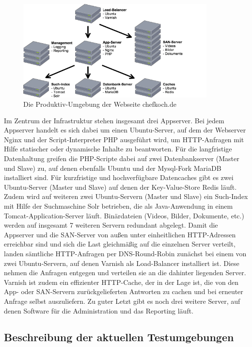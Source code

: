 \begin{figure}[!ht]
  \begin{center}
    \includegraphics[width=10cm]{bilder/Produktiv-Umgebung.png}
    \caption{Die Produktiv-Umgebung der Webseite chefkoch.de}
  \end{center}
\end{figure}

Im Zentrum der Infrastruktur stehen insgesamt drei Appserver. Bei jedem Appserver handelt es sich dabei um einen Ubuntu-Server, auf dem der Webserver Nginx und der Script-Interpreter PHP ausgeführt wird, um HTTP-Anfragen mit Hilfe statischer oder dynamische Inhalte zu beantworten. Für die langfristige Datenhaltung greifen die PHP-Scripte dabei auf zwei Datenbankserver (Master und Slave) zu, auf denen ebenfalls Ubuntu und der Mysql-Fork MariaDB installiert sind. Für kurzfristige und hochverfügbare Datencaches gibt es zwei Ubuntu-Server (Master und Slave) auf denen der Key-Value-Store Redis läuft. Zudem wird auf weiteren zwei Ubuntu-Servern (Master und Slave) ein Such-Index mit Hilfe der Suchmaschine Solr betrieben, die als Java-Anwendung in einem Tomcat-Application-Server läuft. Binärdateien (Videos, Bilder, Dokumente, etc.) werden auf insgesamt 7 weiteren Servern redundant abgelegt. Damit die Appserver und die SAN-Server von außen unter einheitlichen HTTP-Adressen erreichbar sind und sich die Last gleichmäßig auf die einzelnen Server verteilt, landen sämtliche HTTP-Anfragen per DNS-Round-Robin zunächst bei einem von zwei Ubuntu-Servern, auf denen Varnish als Load-Balancer installiert ist. Diese nehmen die Anfragen entgegen und verteilen sie an die dahinter liegenden Server. Varnish ist zudem ein effizienter HTTP-Cache, der in der Lage ist, die von den App- oder SAN-Servern zurückgelieferten Antworten zu cachen und bei erneuter Anfrage selbst auszuliefern. Zu guter Letzt gibt es noch drei weitere Server, auf denen Software für die Administration und das Reporting läuft.

\subsection{Beschreibung der aktuellen Testumgebungen}

